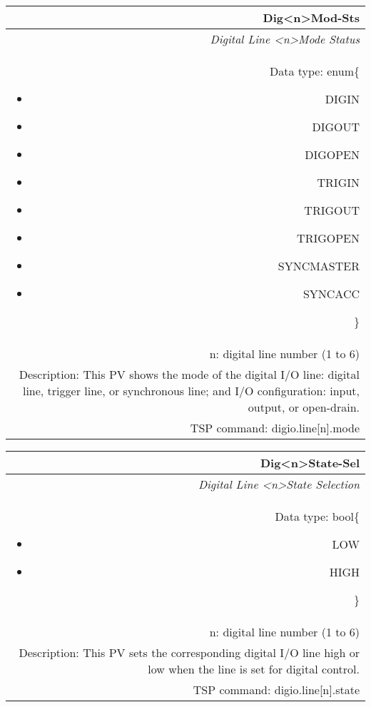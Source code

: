 \documentclass[openany]{article}
\begin{document}
		\begin{tabular}{N}
			\hline
			\bfseries Dig{\textless n\textgreater}Mod-Sts\label{pv:digmod-sts} \\ \hline
			\emph{Digital Line \textless n\textgreater Mode Status} \\
			Data type: enum\{\begin{itemize}[noitemsep]
				\small
				\item[] DIGIN
				\item[] DIGOUT
				\item[] DIGOPEN
				\item[] TRIGIN
				\item[] TRIGOUT
				\item[] TRIGOPEN
				\item[] SYNCMASTER
				\item[] SYNCACC
			\end{itemize}\} \\
			n: digital line number (1 to 6) \\
			Description: This PV shows the mode of the digital I/O line: digital line, trigger line, or synchronous line; and I/O configuration: input, output, or open-drain. \\
			TSP command: digio.line[n].mode
		\end{tabular}

		\begin{tabular}{N}
			\hline
			\bfseries Dig{\textless n\textgreater}State-Sel\label{pv:digstate-sel} \\ \hline
			\emph{Digital Line \textless n\textgreater State Selection} \\
			Data type: bool\{\begin{itemize}[noitemsep]
				\small
				\item[] LOW
				\item[] HIGH
			\end{itemize}\} \\
			n: digital line number (1 to 6) \\
			Description: This PV sets the corresponding digital I/O line high or low when the line is set for digital control. \\
			TSP command: digio.line[n].state
		\end{tabular}
\end{document}
